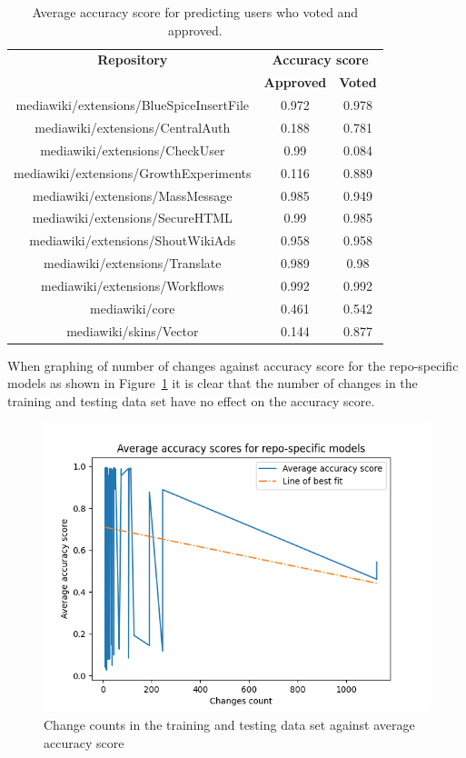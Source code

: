 \begin{table}[H]
    \centering
    \begin{tabular}{@{}c c c@{}} 
    \hline
    \textbf{Repository} & \multicolumn{2}{c}{\textbf{Accuracy score}} \\
    & \textbf{Approved} & \textbf{Voted} \\
\hline
mediawiki/extensions/BlueSpiceInsertFile & 0.972 & 0.978 \\
mediawiki/extensions/CentralAuth & 0.188 & 0.781 \\
mediawiki/extensions/CheckUser & 0.99 & 0.084 \\
mediawiki/extensions/GrowthExperiments & 0.116 & 0.889 \\
mediawiki/extensions/MassMessage & 0.985 & 0.949 \\
mediawiki/extensions/SecureHTML & 0.99 & 0.985 \\
mediawiki/extensions/ShoutWikiAds & 0.958 & 0.958 \\
mediawiki/extensions/Translate & 0.989 & 0.98 \\
mediawiki/extensions/Workflows & 0.992 & 0.992 \\
mediawiki/core & 0.461 & 0.542 \\
mediawiki/skins/Vector & 0.144 & 0.877 \\
    \hline
    \end{tabular}
    \caption{Average accuracy score for predicting users who voted and approved.}
    \label{table:accuracy-score-average}
\end{table}

When graphing of number of changes against accuracy score for the repo-specific models as shown in Figure~\ref{fig:accuracy-score-average-graphed} it is clear that the number of changes in the training and testing data set have no effect on the accuracy score. 

\begin{figure}[h]
    \centering
    \includegraphics[scale=0.5]{images/graphs/neural-network-avg-accuracy-repo-specific.png}
    \caption{Change counts in the training and testing data set against average accuracy score}
    \label{fig:accuracy-score-average-graphed}
\end{figure}

